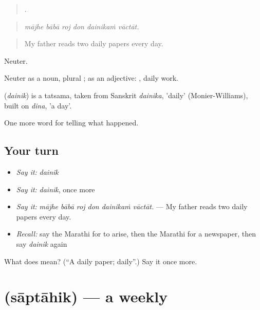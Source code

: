 \begin{quote}
     .
\end{quote}

\begin{quote}
\emph{mājhe bābā roj don dainikaṁ vāctāt.}
\end{quote}

\begin{quote}
My father reads two daily papers every day.
\end{quote}

Neuter.

Neuter as a noun, plural ; as an adjective:  , daily work.

\begin{cousinweb}
\textbf{} (\emph{dainik}) is a tatsama, taken from Sanskrit \emph{dainika}, 'daily' (Monier-Williams), built on \emph{dina}, 'a day'.
\end{cousinweb}

\begin{grammarlens}[title={What you've built}]
One more word for telling what happened.
\end{grammarlens}

\subsection*{Your turn}
\begin{itemize}
\raggedright
  \item \emph{Say it:} \emph{dainik}
  \item \emph{Say it:} \emph{dainik}, once more
  \item \emph{Say it:} \emph{mājhe bābā roj don dainikaṁ vāctāt.} — My father reads two daily papers every day.
  \item \emph{Recall:} say the Marathi for to arise, then the Marathi for a newspaper, then say \emph{dainik} again
\end{itemize}

\begin{tcolorbox}[breakable,colback=teal!4,colframe=teal!35!black,title={Before you move on}]
What does  mean? (\textquotedblleft{}A daily paper; daily\textquotedblright{}.) Say it once more.
\end{tcolorbox}
\section[\texorpdfstring{\mr{साप्ताहिक} (sāptāhik)}{साप्ताहिक (sāptāhik)}]{ (sāptāhik) — a weekly}


